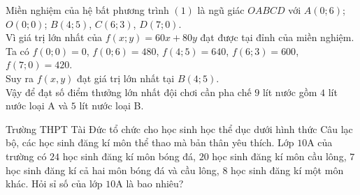 \begin{ex}
{\begin{center}
		\end{center}
		Miền nghiệm của hệ bất phương trình $(1)$ là ngũ giác $OABCD$ với $A(0;6)$; $O(0;0)$; $B(4;5)$, $C(6;3)$, $D(7;0)$. \\
		Vì giá trị lớn nhất của $f(x;y)=60x+80y$ đạt được tại đỉnh của miền nghiệm.\\
		Ta có $f(0;0)=0$, $f(0;6)=480$, $f(4;5)=640$, $f(6;3)=600$, $f(7;0)=420$.\\
		Suy ra $f(x,y)$ đạt giá trị lớn nhất tại $B(4; 5)$.\\
		Vậy để đạt số điểm thưởng lớn nhất đội chơi cần pha chế $9$ lít nước gồm $4$ lít nước loại A và $5$ lít nước loại B. 
	}
\end{ex}

\begin{ex}%
Trường THPT Tài Đức tổ chức cho học sinh học thể dục dưới hình thức Câu lạc bộ, các học sinh đăng kí môn thể thao mà bản thân yêu thích. Lớp $10$A của trường có $24$ học sinh đăng kí môn bóng đá, $20$ học sinh đăng kí môn cầu lông, $7$ học sinh đăng kí cả hai môn bóng đá và cầu lông, $8$ học sinh đăng kí một môn khác. Hỏi sỉ số của lớp $10$A là bao nhiêu?
\end{ex}


